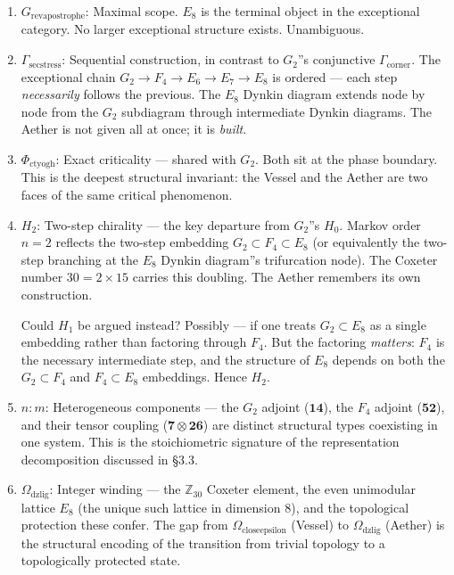 \documentclass[12pt,a4paper]{article}
\newcommand{\pilcrow}{\S}
\begin{document}
\begin{enumerate}
    \item \textbf{$G_{\text{revapostrophe}}$}: Maximal scope. $E_8$ is the terminal object in the exceptional category. No larger exceptional structure exists. Unambiguous.
    \item \textbf{$\Gamma_{\text{secstress}}$}: Sequential construction, in contrast to $G_2$''s conjunctive $\Gamma_{\text{corner}}$. The exceptional chain $G_2 \to F_4 \to E_6 \to E_7 \to E_8$ is ordered --- each step \emph{necessarily} follows the previous. The $E_8$ Dynkin diagram extends node by node from the $G_2$ subdiagram through intermediate Dynkin diagrams. The Aether is not given all at once; it is \emph{built}.
    \item \textbf{$\Phi_{\text{ctyogh}}$}: Exact criticality --- shared with $G_2$. Both sit at the phase boundary. This is the deepest structural invariant: the Vessel and the Aether are two faces of the same critical phenomenon.
    \item 
    \textbf{$H_2$}: Two-step chirality --- the key departure from $G_2$''s $H_0$. Markov order $n=2$ reflects the two-step embedding $G_2 \subset F_4 \subset E_8$ (or equivalently the two-step branching at the $E_8$ Dynkin diagram''s trifurcation node). The Coxeter number $30 = 2 \times 15$ carries this doubling. The Aether remembers its own construction.

    Could $H_1$ be argued instead? Possibly --- if one treats $G_2 \subset E_8$ as a single embedding rather than factoring through $F_4$. But the factoring \emph{matters}: $F_4$ is the necessary intermediate step, and the structure of $E_8$ depends on both the $G_2 \subset F_4$ and $F_4 \subset E_8$ embeddings. Hence $H_2$.

    \item \textbf{$n{:}m$}: Heterogeneous components --- the $G_2$ adjoint ($\mathbf{14}$), the $F_4$ adjoint ($\mathbf{52}$), and their tensor coupling ($\mathbf{7} \otimes \mathbf{26}$) are distinct structural types coexisting in one system. This is the stoichiometric signature of the representation decomposition discussed in \pilcrow{}3.3.
    \item \textbf{$\Omega_{\text{dzlig}}$}: Integer winding --- the $\mathbb{Z}_{30}$ Coxeter element, the even unimodular lattice $E_8$ (the unique such lattice in dimension 8), and the topological protection these confer. The gap from $\Omega_{\text{closeepsilon}}$ (Vessel) to $\Omega_{\text{dzlig}}$ (Aether) is the structural encoding of the transition from trivial topology to a topologically protected state.
\end{enumerate}
\end{document}
